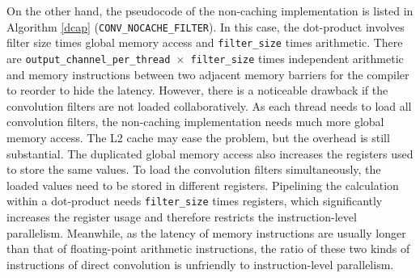 \documentclass{article}
\begin{document}
On the other hand, the pseudocode of the non-caching implementation is listed in Algorithm \ref{dcap} (\texttt{CONV\_NOCACHE\_FILTER}). In this case, the dot-product involves filter size times global memory access and \texttt{filter\_size} times arithmetic. There are \texttt{output\_channel\_per\_thread $\times$ filter\_size} times independent arithmetic and memory instructions between two adjacent memory barriers for the compiler to reorder to hide the latency. However, there is a noticeable drawback if the convolution filters are not loaded collaboratively. As each thread needs to load all convolution filters, the non-caching implementation needs much more global memory access. The L2 cache may ease the problem, but the overhead is still substantial. The duplicated global memory access also increases the registers used to store the same values. To load the convolution filters simultaneously, the loaded values need to be stored in different registers. Pipelining the calculation within a dot-product needs \texttt{filter\_size} times registers, which significantly increases the register usage and therefore restricts the instruction-level parallelism. Meanwhile, as the latency of memory instructions are usually longer than that of floating-point arithmetic instructions, the ratio of these two kinds of instructions of direct convolution is unfriendly to instruction-level parallelism.





    


        
        
        
\end{document}

